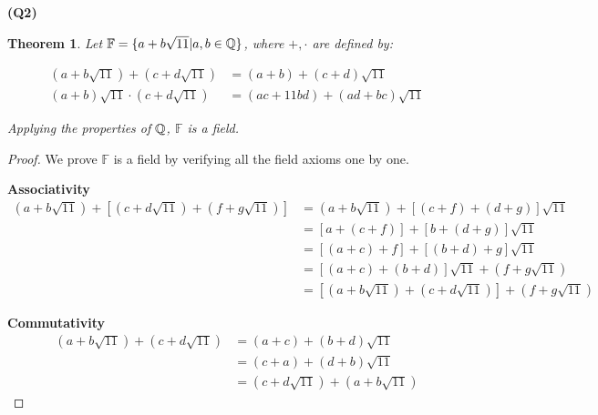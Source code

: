 \documentclass[12pt, a4paper]{article}
\newtheorem*{theorem}{Theorem}
\newcommand{\F}{\mathbb{F}}
\begin{document}
\textbf{(Q2)}

\begin{theorem}
    Let $\F = \{a + b\sqrt{11} | a, b \in \Q\}$, where $+,\cdot$ are
    defined by:

    \begin{align*}
        (a + b\sqrt{11}) + (c + d\sqrt{11}) & = (a + b) + (c + d)\sqrt{11}\\
        (a + b)\sqrt{11} \cdot (c + d\sqrt{11}) & =
        (ac + 11bd) + (ad + bc)\sqrt{11}
    \end{align*}

    Applying the properties of $\mathbb{Q}$, $\F$ is a field.
\end{theorem}

\begin{proof}
    We prove $\F$ is a field by verifying all the field axioms one by one.

    \vspace{5mm}

    \textbf{Associativity}
    \begin{align*}
        (a + b\sqrt{11}) + \left[(c + d\sqrt{11}) + (f + g\sqrt{11})\right]
        & = (a + b\sqrt{11}) + \left[(c + f) + (d + g)\right]\sqrt{11}\\
        & = \left[a + (c + f)\right] + \left[b + (d + g)\right]\sqrt{11}\\
        & = [(a + c) + f] + [(b + d) + g]\sqrt{11}\\
        & = \left[(a + c) + (b + d)\right]\sqrt{11} + (f + g\sqrt{11})\\
        & = \left[(a + b\sqrt{11}) + (c + d\sqrt{11})\right] + (f + g\sqrt{11})
    \end{align*}

    \vspace{5mm}
    \textbf{Commutativity}
    \begin{align*}
        (a + b\sqrt{11}) + (c + d\sqrt{11}) & = (a + c) + (b + d)\sqrt{11}\\
        & = (c + a) + (d + b)\sqrt{11}\\
        & = (c + d\sqrt{11}) + (a + b\sqrt{11})
    \end{align*}


\end{proof}
\end{document}
